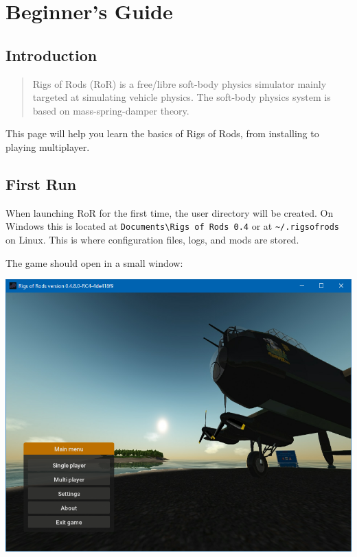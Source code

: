 \hypertarget{Beginners-Guide}{%
\chapter{Beginner's Guide}\label{Beginners-Guide}}

\hypertarget{introduction}{%
\section{Introduction}\label{introduction}}

\begin{quote}
Rigs of Rods (RoR) is a free/libre soft-body physics simulator mainly
targeted at simulating vehicle physics. The soft-body physics system is
based on mass-spring-damper theory.
\end{quote}

This page will help you learn the basics of Rigs of Rods, from
installing to playing multiplayer.

\hypertarget{first-run}{%
\section{First Run}\label{first-run}}

When launching RoR for the first time, the user directory will be
created. On Windows this is located at
\texttt{Documents\textbackslash{}Rigs\ of\ Rods\ 0.4} or at
\texttt{\textasciitilde{}/.rigsofrods} on Linux. This is where
configuration files, logs, and mods are stored.

The game should open in a small window:  

\includegraphics{images/bg-firstrun1.png}

